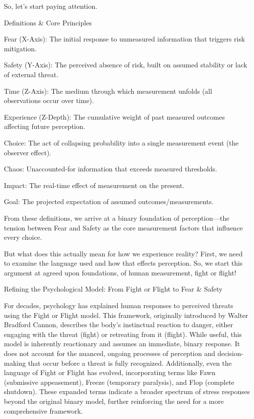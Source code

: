 \documentclass[11pt]{article}
\begin{document}
So, let’s start paying attention.

Definitions & Core Principles

Fear (X-Axis): The initial response to unmeasured information that triggers risk mitigation.

Safety (Y-Axis): The perceived absence of risk, built on assumed stability or lack of external threat.

Time (Z-Axis): The medium through which measurement unfolds (all observations occur over time).

Experience (Z-Depth): The cumulative weight of past measured outcomes affecting future perception.

Choice: The act of collapsing probability into a single measurement event (the observer effect).

Chaos: Unaccounted-for information that exceeds measured thresholds. 

Impact: The real-time effect of measurement on the present.

Goal: The projected expectation of assumed outcomes/measurements.

From these definitions, we arrive at a binary foundation of perception—the tension between Fear and Safety as the core measurement factors that influence every choice.

But what does this actually mean for how we experience reality? First, we need to examine the language used and how that effects perception. So, we start this argument at agreed upon foundations, of human measurement, fight or flight!

Refining the Psychological Model: From Fight or Flight to Fear & Safety

For decades, psychology has explained human responses to perceived threats using the Fight or Flight model. This framework, originally introduced by Walter Bradford Cannon, describes the body's instinctual reaction to danger, either engaging with the threat (fight) or retreating from it (flight). While useful, this model is inherently reactionary and assumes an immediate, binary response. It does not account for the nuanced, ongoing processes of perception and decision-making that occur before a threat is fully recognized. Additionally, even the language of Fight or Flight has evolved, incorporating terms like Fawn (submissive appeasement), Freeze (temporary paralysis), and Flop (complete shutdown). These expanded terms indicate a broader spectrum of stress responses beyond the original binary model, further reinforcing the need for a more comprehensive framework.
\end{document}
